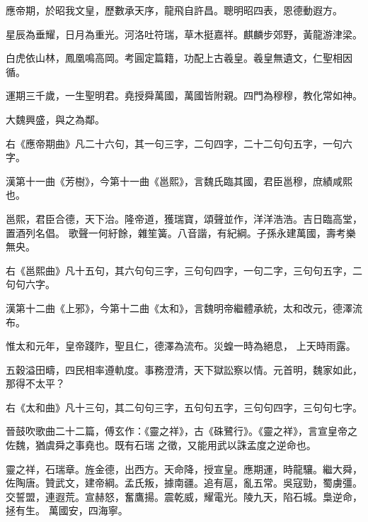 \begin{pinyinscope}
 應帝期，於昭我文皇，歷數承天序，龍飛自許昌。聰明昭四表，恩德動遐方。



 星辰為垂耀，日月為重光。河洛吐符瑞，草木挺嘉祥。麒麟步郊野，黃龍游津梁。



 白虎依山林，鳳凰鳴高岡。考圓定篇籍，功配上古羲皇。羲皇無遺文，仁聖相因循。



 運期三千歲，一生聖明君。堯授舜萬國，萬國皆附親。四門為穆穆，教化常如神。



 大魏興盛，與之為鄰。



 右《應帝期曲》凡二十六句，其一句三字，二句四字，二十二句句五字，一句六字。



 漢第十一曲《芳樹》，今第十一曲《邕熙》，言魏氏臨其國，君臣邕穆，庶績咸熙也。



 邕熙，君臣合德，天下治。隆帝道，獲瑞寶，頌聲並作，洋洋浩浩。吉日臨高堂，置酒列名倡。
 歌聲一何紆餘，雜笙簧。八音諧，有紀綱。子孫永建萬國，壽考樂無央。



 右《邕熙曲》凡十五句，其六句句三字，三句句四字，一句二字，三句句五字，二句句六字。



 漢第十二曲《上邪》，今第十二曲《太和》，言魏明帝繼體承統，太和改元，德澤流布。



 惟太和元年，皇帝踐阼，聖且仁，德澤為流布。災蝗一時為絕息，
 上天時雨露。



 五穀溢田疇，四民相率遵軌度。事務澄清，天下獄訟察以情。元首明，魏家如此，那得不太平？



 右《太和曲》凡十三句，其二句句三字，五句句五字，三句句四字，三句句七字。



 晉鼓吹歌曲二十二篇，傅玄作：《靈之祥》，古《硃鷺行》。《靈之祥》，言宣皇帝之佐魏，猶虞舜之事堯也。既有石瑞
 之徵，又能用武以誅孟度之逆命也。



 靈之祥，石瑞章。旌金德，出西方。天命降，授宣皇。應期運，時龍驤。繼大舜，佐陶唐。贊武文，建帝綱。孟氏叛，據南疆。追有扈，亂五常。吳寇勁，蜀虜彊。交誓盟，連遐荒。宣赫怒，奮鷹揚。震乾威，耀電光。陵九天，陷石城。梟逆命，拯有生。
 萬國安，四海寧。




\end{pinyinscope}
